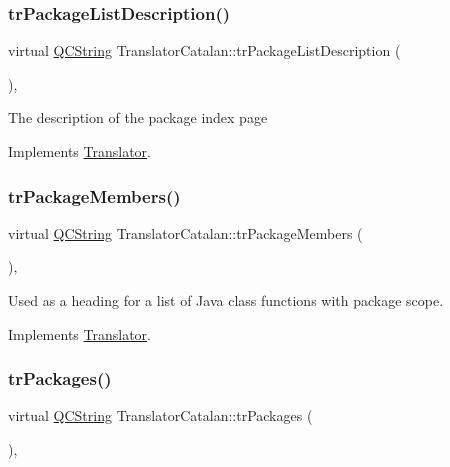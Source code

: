 \subsubsection{\texorpdfstring{trPackageListDescription()}{trPackageListDescription()}}
{\footnotesize\ttfamily virtual \mbox{\hyperlink{class_q_c_string}{Q\+C\+String}} Translator\+Catalan\+::tr\+Package\+List\+Description (\begin{DoxyParamCaption}{ }\end{DoxyParamCaption})\hspace{0.3cm}{\ttfamily [inline]}, {\ttfamily [virtual]}}

The description of the package index page 

Implements \mbox{\hyperlink{class_translator}{Translator}}.

\mbox{\label{class_translator_catalan_afa0e5aa037803c4572f1693cfbaae9c4}} 
\subsubsection{\texorpdfstring{trPackageMembers()}{trPackageMembers()}}
{\footnotesize\ttfamily virtual \mbox{\hyperlink{class_q_c_string}{Q\+C\+String}} Translator\+Catalan\+::tr\+Package\+Members (\begin{DoxyParamCaption}{ }\end{DoxyParamCaption})\hspace{0.3cm}{\ttfamily [inline]}, {\ttfamily [virtual]}}

Used as a heading for a list of Java class functions with package scope. 

Implements \mbox{\hyperlink{class_translator}{Translator}}.

\mbox{\label{class_translator_catalan_a605ea471126403acd325d0afb1fd9ed8}} 
\subsubsection{\texorpdfstring{trPackages()}{trPackages()}}
{\footnotesize\ttfamily virtual \mbox{\hyperlink{class_q_c_string}{Q\+C\+String}} Translator\+Catalan\+::tr\+Packages (\begin{DoxyParamCaption}{ }\end{DoxyParamCaption})\hspace{0.3cm}{\ttfamily [inline]}, {\ttfamily [virtual]}}


